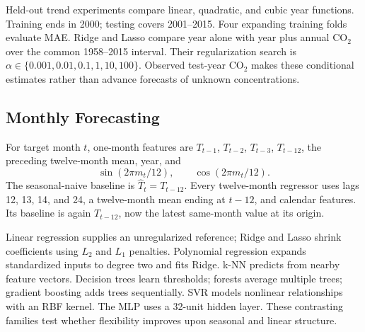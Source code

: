 \documentclass[conference]{IEEEtran}
\begin{document}
Held-out trend experiments compare linear, quadratic, and cubic year functions. Training ends in 2000; testing covers 2001--2015. Four expanding training folds evaluate MAE. Ridge and Lasso compare year alone with year plus annual CO$_2$ over the common 1958--2015 interval. Their regularization search is $\alpha\in\{0.001,0.01,0.1,1,10,100\}$. Observed test-year CO$_2$ makes these conditional estimates rather than advance forecasts of unknown concentrations.

\subsection{Monthly Forecasting}
For target month $t$, one-month features are $T_{t-1}$, $T_{t-2}$, $T_{t-3}$, $T_{t-12}$, the preceding twelve-month mean, year, and
\begin{equation}\sin(2\pi m_t/12),\qquad\cos(2\pi m_t/12).\end{equation}
The seasonal-naive baseline is $\hat T_t=T_{t-12}$. Every twelve-month regressor uses lags 12, 13, 14, and 24, a twelve-month mean ending at $t-12$, and calendar features. Its baseline is again $T_{t-12}$, now the latest same-month value at its origin.

Linear regression supplies an unregularized reference; Ridge and Lasso shrink coefficients using $L_2$ and $L_1$ penalties. Polynomial regression expands standardized inputs to degree two and fits Ridge. k-NN predicts from nearby feature vectors. Decision trees learn thresholds; forests average multiple trees; gradient boosting adds trees sequentially. SVR models nonlinear relationships with an RBF kernel. The MLP uses a 32-unit hidden layer. These contrasting families test whether flexibility improves upon seasonal and linear structure.
\end{document}
